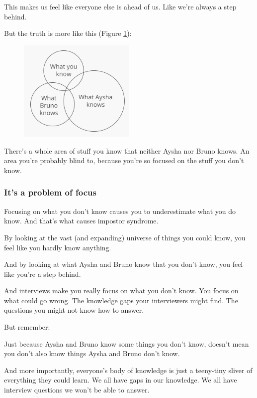 \documentclass{article}
\begin{document}
This makes us feel like everyone else is ahead of us. Like we're always a step behind.

But the truth is more like this (Figure \ref{fig:true-what-everyone-else-know}):

\begin{figure}[!ht]
  \centering
  \includegraphics[width=0.5\textwidth]{pics/true-what-everyone-else-know}
  \label{fig:true-what-everyone-else-know}
\end{figure}


There's a whole area of stuff you know that neither Aysha nor Bruno knows. An area you're probably blind to, because you're so focused on the stuff you don't know.


\subsubsection{It's a problem of focus}

Focusing on what you don't know causes you to underestimate what you do know. And that's what causes impostor syndrome.

By looking at the vast (and expanding) universe of things you could know, you feel like you hardly know anything.

And by looking at what Aysha and Bruno know that you don't know, you feel like you're a step behind.

And interviews make you really focus on what you don't know. You focus on what could go wrong. The knowledge gaps your interviewers might find. The questions you might not know how to answer.

But remember:

Just because Aysha and Bruno know some things you don't know, doesn't mean you don't also know things Aysha and Bruno don't know.

And more importantly, everyone's body of knowledge is just a teeny-tiny sliver of everything they could learn. We all have gaps in our knowledge. We all have interview questions we won't be able to answer.
\end{document}
